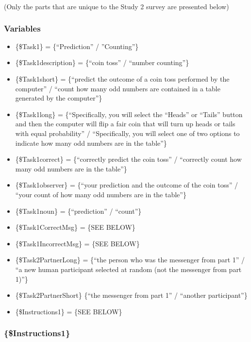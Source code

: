 (Only the parts that are unique to the Study 2 survey are presented below)

\subsubsection*{Variables}
\begin{itemize}
\item \{\$Task1\} = \{``Prediction'' / ''Counting''\} 
\item \{\$Task1description\} = \{``coin toss''
/ ``number counting''\} 
\item \{\$Task1short\} = \{``predict the outcome of a coin toss
performed by the computer'' / ``count how many odd numbers are contained in a
table generated by the computer''\} 
\item \{\$Task1long\} = \{``Specifically, you will
select the ``Heads'' or ``Tails'' button and then the computer will flip a fair
coin that will turn up heads or tails with equal probability'' / ``Specifically,
you will select one of two options to indicate how many odd numbers are in the
table''\} 
\item \{\$Task1correct\} = \{``correctly predict the coin toss'' / ``correctly
count how many odd numbers are in the table''\} 
\item \{\$Task1observer\} = \{``your
prediction and the outcome of the coin toss'' / ``your count of how many odd
numbers are in the table''\} 
\item \{\$Task1noun\} = \{``prediction'' / ``count''\}
\item \{\$Task1CorrectMsg\} = \{SEE BELOW\}
\item \{\$Task1IncorrectMsg\} = \{SEE BELOW\} 
\item \{\$Task2PartnerLong\} = \{``the
person who was the messenger from part 1'' / ``a new human participant selected
at random (not the messenger from part 1)''\} 
\item \{\$Task2PartnerShort\} \{``the
messenger from part 1'' / ``another participant''\} 
\item \{\$Instructions1\} = \{SEE
BELOW\}
\end{itemize}

\subsubsection*{\{\$Instructions1\}}

